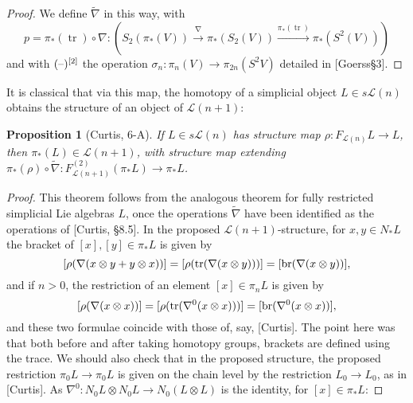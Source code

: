 \documentclass[11pt]{amsart}
\theoremstyle{plain}
\newtheorem{prop}[thm]{Proposition}
\theoremstyle{definition}
\DeclareMathOperator{\trace}{tr}
\newcommand{\DASH}{\textup{--}}
\renewcommand{\to}{\longrightarrow}
\newcommand{\calL}{\mathcal{L}}
\theoremstyle{plain}
\newcommand{\restn}[1]{#1^{[2]}}
\newcommand{\F}{\mathbb{F}}
\begin{document}
\begin{Lie algebras in characteristic 2 and their homotopy operations}
\begin{proof}
We define $\widetilde{\nabla}$ in this way, with
\[p=\pi_*(\trace)\circ\nabla:\left(S_2(\pi_*(V))\overset{\nabla}{\to}\pi_*(S_2(V))\overset{\pi_*(\trace)}{\to}\pi_*(S^2(V))\right)\]
and with $\restn{(\DASH)}$ the operation $\sigma_n:\pi_n(V)\to \pi_{2n}(S^2V)$ detailed in [Goerss\S3].
%
\end{proof}
It is classical that via this map, the homotopy of a simplicial object $L\in s\calL(n)$ obtains the structure of an object of $\calL(n+1)$:
\begin{prop}[Curtis, 6-A]\label{prop on top operations}
If $L\in s\calL(n)$ has structure map $\rho:F_{\calL(n)}L\to L$, then $\pi_*(L)\in\calL(n+1)$, with structure map extending $\pi_*(\rho)\circ\widetilde{\nabla}:F^{(2)}_{\calL(n+1)}(\pi_*L)\to \pi_*L$.
\end{prop}
\begin{proof}
This theorem follows from the analogous theorem for fully restricted simplicial Lie algebras $L$, once the operations $\widetilde{\nabla}$ have been identified as the operations of [Curtis, \S8.5]. In the proposed $\calL(n+1)$-structure, for $x,y
\in N_*L$ the bracket of $[x],[y]\in\pi_*L$ is given by
\[[\rho(\nabla(x\otimes y+y\otimes x))]=[\rho(\trace(\nabla(x\otimes y)))]=[\textup{br}(\nabla(x\otimes y))],\]
and if $n>0$, the restriction of an element $[x]\in\pi_nL$ is given by
\[[\rho(\nabla(x\otimes x))]=[\rho(\trace(\nabla^0(x\otimes x)))]=[\textup{br}(\nabla^0(x\otimes x))],\]
and these two formulae coincide with those of, say, [Curtis]. The point here was that both before and after taking homotopy groups, brackets are defined using the trace. We should also check that in the proposed structure, the proposed restriction $\pi_0L\to \pi_0L$ is given on the chain level by the restriction $L_0\to L_0$, as in [Curtis]. As $\nabla^0:N_0L\otimes N_0L\to N_0(L\otimes L)$ is the identity, for $[x]\in\pi_*L$:

\end{proof}
\end{Lie algebras in characteristic 2 and their homotopy operations}
\end{document}
